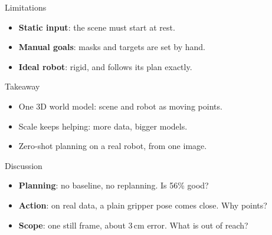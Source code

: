 \documentclass[aspectratio=169,12pt]{beamer}
\newcommand{\pw}[1]{{\color{pw}#1}}
\begin{document}
\begin{frame}[label=limits]{Limitations}
  \vfill
  \small
  \begin{itemize}\setlength{\itemsep}{16pt}
    \item<1-> \textbf{Static input}: the scene must start at rest.
    \item<2-> \textbf{Manual goals}: masks and targets are set by hand.
    \item<3-> \textbf{Ideal robot}: rigid, and follows its plan exactly.
  \end{itemize}
  \vfill
\end{frame}

\begin{frame}{Takeaway}
  \vfill
  \small
  \begin{itemize}\setlength{\itemsep}{16pt}
    \item<1-> One \pw{3D world model}: scene and robot as moving points.
    \item<2-> \pw{Scale keeps helping}: more data, bigger models.
    \item<3-> \pw{Zero-shot planning} on a real robot, from one image.
  \end{itemize}
  \vfill
\end{frame}

\begin{frame}[label=discussion]{Discussion}
  \vfill
  \small
  \begin{itemize}\setlength{\itemsep}{16pt}
    \item<1-> \textbf{Planning}: no baseline, no replanning. Is 56\% good?
    \item<2-> \textbf{Action}: on real data, a plain gripper pose comes close. Why points?
    \item<3-> \textbf{Scope}: one still frame, about 3\,cm error. What is out of reach?
  \end{itemize}
  \vfill
\end{frame}

\appendix
\end{document}
